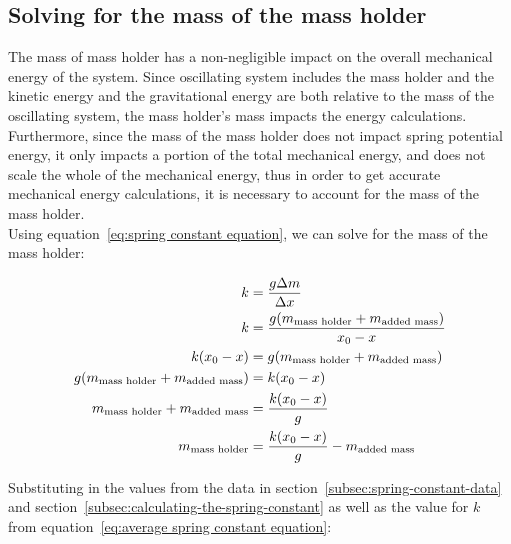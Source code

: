 \documentclass{article}
\begin{document}
        \subsection{Solving for the mass of the mass holder}
            
            The mass of mass holder has a non-negligible impact on the overall mechanical energy of the system.
            Since oscillating system includes the mass holder and the kinetic energy and the gravitational energy are both relative to the mass of the oscillating system, the mass holder's mass impacts the energy calculations.
            Furthermore, since the mass of the mass holder does not impact spring potential energy, it only impacts a portion of the total mechanical energy, and does not scale the whole of the mechanical energy, thus in order to get accurate mechanical energy calculations, it is necessary to account for the mass of the mass holder. \\
            
            Using equation~\ref{eq:spring constant equation}, we can solve for the mass of the mass holder:
            
            \begin{equation}
                \begin{aligned}
                    \notag
                    k &= \frac{g \Delta m}{\Delta x} \\
                    k &= \frac{g (m_{\text{mass holder}} + m_{\text{added mass}})}{x_0-x} \\
                    k(x_0-x) &= g (m_{\text{mass holder}} + m_{\text{added mass}}) \\
                    g(m_{\text{mass holder}} + m_{\text{added mass}}) &= k(x_0-x) \\
                    m_{\text{mass holder}} + m_{\text{added mass}} &= \frac{k(x_0-x)}{g} \\
                    m_{\text{mass holder}} &= \frac{k(x_0-x)}{g} - m_{\text{added mass}} \\
                \end{aligned}\label{eq:mass-of-mass-holder}
            \end{equation}
            
            Substituting in the values from the data in section~\ref{subsec:spring-constant-data} and section~\ref{subsec:calculating-the-spring-constant} as well as the value for $k$ from equation~\ref{eq:average spring constant equation}:
            
\end{document}

